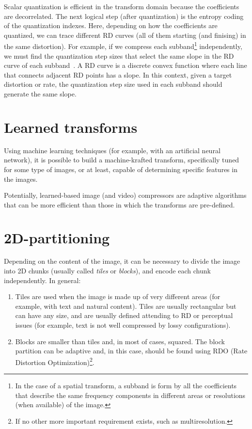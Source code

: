 Scalar quantization is efficient in the transform domain because the
coefficients are decorrelated. The next logical step (after
quantization) is the entropy coding of the quantization indexes. Here,
depending on how the coefficients are quantized, we can trace
different RD curves (all of them starting (and finising) in the same
distortion). For example, if we compress each subband\footnote{In the
  case of a spatial transform, a subband is form by all the
  coefficients that describe the same frequency components in
  different areas or resolutions (when available) of the image.}
independently, we must find the quantization step sizes that select
the same slope in the RD curve of each
subband~\cite{vruiz__information_theory}. A RD curve is a discrete
convex function where each line that connects adjacent RD points has a
slope.  In this context, given a target distortion or rate, the
quantization step size used in each subband should generate the same
slope.


\section{Learned transforms}

Using machine learning techniques (for example, with an artificial
neural network), it is possible to build a machine-krafted transform,
specifically tuned for some type of images, or at least, capable of
determining specific features in the images.

Potentially, learned-based image (and video) compressors are adaptive
algorithms that can be more efficient than those in which the
transforms are pre-defined.


\section{2D-partitioning}

Depending on the content of the image, it can be necessary to divide
the image into 2D chunks (usually called \emph{tiles} or
\emph{blocks}), and encode each chunk independently. In general:
\begin{enumerate}
\item Tiles are used when the image is made up of very different areas
  (for example, with text and natural content). Tiles are usually
  rectangular but can have any size, and are usually defined attending
  to RD or perceptual issues (for example, text is not well compressed by
  lossy configurations).
\item Blocks are smaller than tiles and, in most of cases,
  squared. The block partition can be adaptive and, in this case,
  should be found using RDO (Rate Distortion Optimization)\footnote{If
    no other more important requirement exists, such as
    multiresolution.}.
\end{enumerate}

